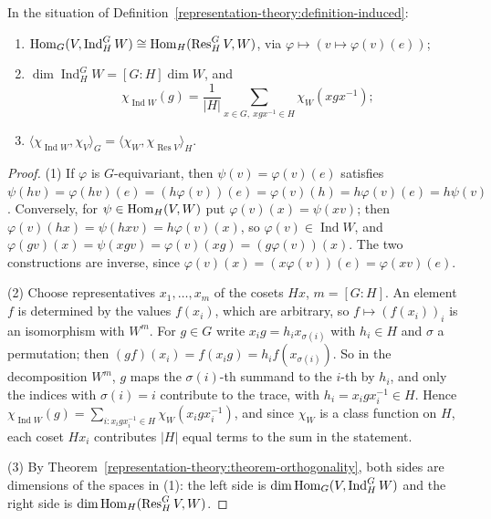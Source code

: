 \begin{proposition}\label{representation-theory:proposition-frobenius}
In the situation of Definition~\ref{representation-theory:definition-induced}:
\begin{enumerate}
\item $\operatorname{Hom}_G(V, \operatorname{Ind}_H^GW) \cong \operatorname{Hom}_H(\operatorname{Res}^G_HV, W)$, via $\varphi \mapsto (v \mapsto \varphi(v)(e))$;
\item $\dim\operatorname{Ind}_H^GW = [G : H]\dim W$, and
\[
\chi_{\operatorname{Ind}W}(g) = \frac{1}{|H|}\sum_{x \in G,\ xgx^{-1} \in H}\chi_W(xgx^{-1});
\]
\item $\langle\chi_{\operatorname{Ind}W}, \chi_V\rangle_G = \langle\chi_W, \chi_{\operatorname{Res}V}\rangle_H$.
\end{enumerate}
\end{proposition}

\begin{proof}
(1) If $\varphi$ is $G$-equivariant, then $\psi(v) = \varphi(v)(e)$ satisfies $\psi(hv) = \varphi(hv)(e) = (h\varphi(v))(e) = \varphi(v)(h) = h\varphi(v)(e) = h\psi(v)$. Conversely, for $\psi \in \operatorname{Hom}_H(V, W)$ put $\varphi(v)(x) = \psi(xv)$; then
$\varphi(v)(hx) = \psi(hxv) = h\varphi(v)(x)$, so $\varphi(v) \in \operatorname{Ind}W$, and $\varphi(gv)(x) = \psi(xgv) = \varphi(v)(xg) = (g\varphi(v))(x)$. The two constructions are inverse, since $\varphi(v)(x) = (x\varphi(v))(e) = \varphi(xv)(e)$.

(2) Choose representatives $x_1, \ldots, x_m$ of the cosets $Hx$, $m = [G : H]$. An element $f$ is determined by the values $f(x_i)$, which are arbitrary, so $f \mapsto (f(x_i))_i$ is an isomorphism with $W^m$. For $g \in G$ write
$x_ig = h_ix_{\sigma(i)}$ with $h_i \in H$ and $\sigma$ a permutation; then $(gf)(x_i) = f(x_ig) = h_if(x_{\sigma(i)})$. So in the decomposition $W^m$, $g$ maps the $\sigma(i)$-th summand to the $i$-th by $h_i$, and only the indices with
$\sigma(i) = i$ contribute to the trace, with $h_i = x_igx_i^{-1} \in H$. Hence $\chi_{\operatorname{Ind}W}(g) = \sum_{i : x_igx_i^{-1} \in H}\chi_W(x_igx_i^{-1})$, and since $\chi_W$ is a class function on $H$, each coset $Hx_i$ contributes $|H|$ equal terms to
the sum in the statement.

(3) By Theorem~\ref{representation-theory:theorem-orthogonality}, both sides are dimensions of the spaces in (1): the left side is $\dim\operatorname{Hom}_G(V, \operatorname{Ind}_H^GW)$ and the right side is $\dim\operatorname{Hom}_H(\operatorname{Res}^G_HV, W)$.
\end{proof}

